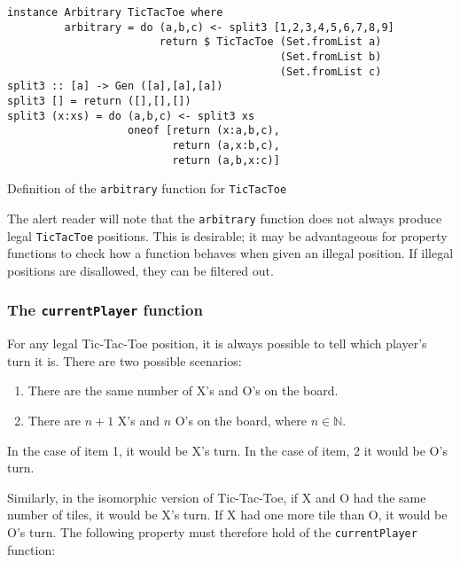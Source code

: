 \begin{fragment}
\begin{lstlisting}
instance Arbitrary TicTacToe where
         arbitrary = do (a,b,c) <- split3 [1,2,3,4,5,6,7,8,9]
                        return $ TicTacToe (Set.fromList a) 
                                           (Set.fromList b) 
                                           (Set.fromList c)
split3 :: [a] -> Gen ([a],[a],[a])
split3 [] = return ([],[],[])
split3 (x:xs) = do (a,b,c) <- split3 xs
                   oneof [return (x:a,b,c), 
                          return (a,x:b,c), 
                          return (a,b,x:c)]
\end{lstlisting}
\caption{Definition of the \texttt{arbitrary} function for \texttt{TicTacToe}}
\label{frag:arbitraryTicTacToe}
\end{fragment}


The alert reader will note that the \texttt{arbitrary} function does not always produce legal \texttt{TicTacToe} positions. This is desirable; it may be advantageous for property functions to check how a function behaves when given an illegal position. If illegal positions are disallowed, they can be filtered out.


\subsubsection{The \texttt{currentPlayer} function}
For any legal Tic-Tac-Toe position, it is always possible to tell which player's turn it is. There are two possible scenarios:
\begin{enumerate}
\item There are the same number of X's and O's on the board. 
\item There are $n+1$ X's and $n$ O's on the board, where $n\in\mathbb{N}$.
\end{enumerate}
In the case of item 1, it would be X's turn. In the case of item, 2 it would be O's turn. 

Similarly, in the isomorphic version of Tic-Tac-Toe, if X and O had the same number of tiles, it would be X's turn. If X had one more tile than O, it would be O's turn. The following property must therefore hold of the \texttt{currentPlayer} function:


